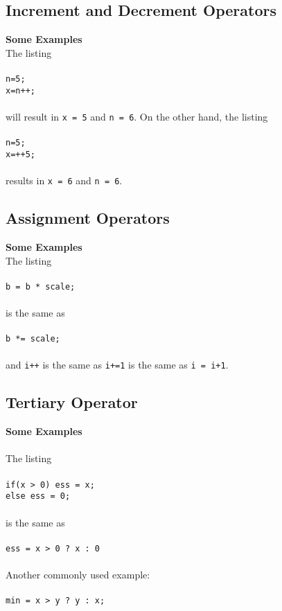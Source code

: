 \documentclass{article}
\begin{document}
\subsection{Increment and Decrement Operators}
\label{sec:increment}
{\bf Some Examples}\\
The listing \\\\
{\tt n=5;\\
x=n++;}\\\\
will result in {\tt x = 5} and {\tt n = 6}.  
On the other hand, the listing \\\\
{\tt n=5;\\
x=++5;}\\\\
results in {\tt x = 6} and {\tt n = 6}.

\subsection{Assignment Operators}
\label{sec:assignment}
{\bf Some Examples}\\
The listing\\\\
{\tt b = b * scale;}\\\\
is the same as\\\\
{\tt b *= scale;}
\\\\
and {\tt i++} is the same as {\tt i+=1} is the same as {\tt i = i+1}.

\subsection{Tertiary Operator}
\label{sec:tertiary}
{\bf Some Examples}\\\\
The listing\\\\
{\tt if(x > 0) ess = x;\\
else ess = 0;}\\\\
is the same as \\\\
{\tt ess = x > 0 ? x : 0 }\\\\
Another commonly used example:\\\\
{\tt min = x > y ? y : x;}
\end{document}
